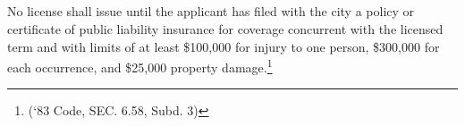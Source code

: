 \subsection{}
No license shall issue until the applicant has filed with the city a policy or certificate of public liability insurance for coverage concurrent with the licensed term and with limits of at least \$100,000 for injury to one person, \$300,000 for each occurrence, and \$25,000 property damage.\footnote{(‘83 Code, SEC. 6.58, Subd. 3)}
